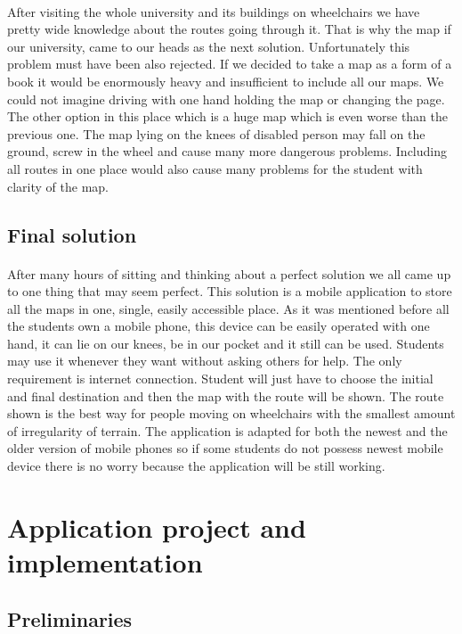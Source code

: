 \documentclass[12pt]{article}
\begin{document}
\paragraph{}After visiting the whole university and its buildings on wheelchairs we have pretty wide knowledge about the routes going through it. That is why the map if our university, came to our heads as the next solution. Unfortunately this problem must have been also rejected. If we decided to take a map as a form of a book it would be enormously heavy and insufficient to include all our maps. We could not imagine driving with one hand holding the map or changing the page. The other option in this place which is a huge map which is even worse than the previous one. The map lying on the knees of disabled person may fall on the ground, screw in the wheel and cause many more dangerous problems. Including all routes in one place would also cause many problems for the student with clarity of the map. 

\subsection{Final solution}
\paragraph{}After many hours of sitting and thinking about a perfect solution we all came up to one thing that may seem perfect. This solution is a mobile application to store all the maps in one, single,  easily accessible place. As it was mentioned before all the students own a mobile phone, this device can be easily operated with one hand, it can lie on our knees, be in our pocket and it still can be used. Students may use it whenever they want without asking others for help. The only requirement is internet connection.  Student will just have to choose the initial and final destination and then the map with the route will be shown. The route shown is the best way for people moving on wheelchairs with the smallest amount of irregularity of terrain. The application is adapted for both the newest and the older version of mobile phones so if some students do not possess newest mobile device there is no worry because the application will be still working. 


\section{Application project and implementation}
\subsection{Preliminaries}
\end{document}

